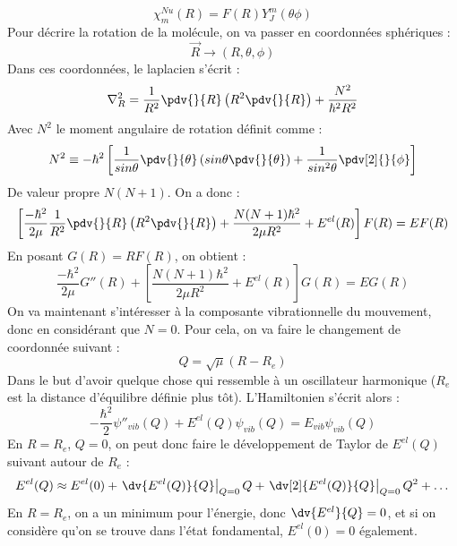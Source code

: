 \begin{equation*}
    \chi^{Nu}_m(R) = F(R)Y^m_J(\theta\phi)
\end{equation*}
Pour décrire la rotation de la molécule, on va passer en coordonnées sphériques : 
\begin{equation*}
    \Vec{R} \rightarrow (R, \theta, \phi)
\end{equation*}
Dans ces coordonnées, le laplacien s'écrit : 
\begin{equation*}
    \nabla^2_R = \frac{1}{R^2}\pdv{}{R}\left(R^2\pdv{}{R}\right) + \frac{N^2}{\hbar^2R^2}
\end{equation*}
Avec $N^2$ le moment angulaire de rotation définit comme :
\begin{equation*}
    N^2 \equiv -\hbar^2\left[\frac{1}{sin\theta}\pdv{}{\theta}\left(sin\theta\pdv{}{\theta}\right) + \frac{1}{sin^2\theta}\pdv[2]{}{\phi}\right]
\end{equation*}
De valeur propre $N(N+1)$.\newline
On a donc : 
\begin{equation*}
    \left[\frac{-\hbar^2}{2\mu}\frac{1}{R^2}\pdv{}{R}\left(R^2\pdv{}{R}\right) + \frac{N(N+1)\hbar^2}{2\mu R^2} + E^{el}(R)\right]F(R) = EF(R)
\end{equation*}
En posant $G(R) = RF(R)$, on obtient :
\begin{equation*}
    \frac{-\hbar^2}{2\mu}G''(R) + \left[\frac{N(N+1)\hbar^2}{2\mu R^2} + E^{el}(R)\right]G(R) = EG(R)
\end{equation*}
On va maintenant s'intéresser à la composante vibrationnelle du mouvement, donc en considérant que $N = 0$. Pour cela, on va faire le changement de coordonnée suivant : 
\begin{equation*}
    Q = \sqrt{\mu}(R-R_e)
\end{equation*}
Dans le but d'avoir quelque chose qui ressemble à un oscillateur harmonique ($R_e$ est la distance d'équilibre définie plus tôt). L'Hamiltonien s'écrit alors : 
\begin{equation*}
    -\frac{\hbar^2}{2}\psi''_{vib}(Q) + E^{el}(Q)\psi_{vib}(Q) = E_{vib}\psi_{vib}(Q)
\end{equation*}
En $R = R_e$, $Q = 0$, on peut donc faire le développement de Taylor de $E^{el}(Q)$ suivant autour de $R_e$ :
\begin{equation*}
    E^{el}(Q) \approx E^{el}(0) + \left. \dv{E^{el}(Q)}{Q}\right|_{Q = 0}Q + \left. \dv[2]{E^{el}(Q)}{Q}\right|_{Q = 0}Q^2 + \dots
\end{equation*}
En $R = R_e$, on a un minimum pour l'énergie, donc $\dv{E^{el}}{Q} = 0$, et si on considère qu'on se trouve dans l'état fondamental, $E^{el}(0) = 0$ également.\newline
